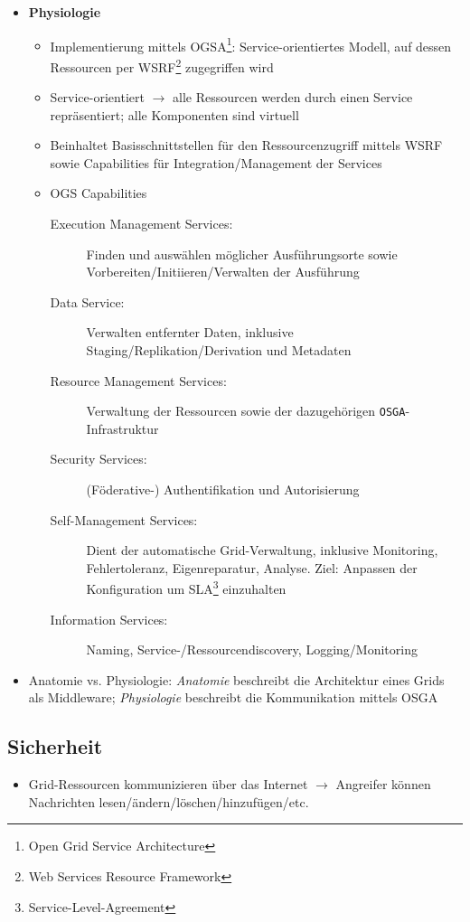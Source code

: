 \begin{itemize}
\begin{itemize}
	\end{itemize}
	\item \textbf{Physiologie}
	\begin{itemize}
		\item Implementierung mittels OGSA\footnote{Open Grid Service Architecture}: Service-orientiertes Modell, auf dessen Ressourcen per WSRF\footnote{Web Services Resource Framework} zugegriffen wird
		\item Service-orientiert \(\rightarrow\) alle Ressourcen werden durch einen Service repräsentiert; alle Komponenten sind virtuell
		\item Beinhaltet Basisschnittstellen für den Ressourcenzugriff mittels WSRF sowie Capabilities für Integration/Management der Services
		\item OGS Capabilities
		\begin{description}
			\item[Execution Management Services:] Finden und auswählen möglicher Ausführungsorte sowie Vorbereiten/Initiieren/Verwalten der Ausführung
			\item[Data Service:] Verwalten entfernter Daten, inklusive Staging/Replikation/Derivation und Metadaten
			\item[Resource Management Services:] Verwaltung der Ressourcen sowie der dazugehörigen \texttt{OSGA}-Infrastruktur
			\item[Security Services:] (Föderative-) Authentifikation und Autorisierung
			\item[Self-Management Services:] Dient der automatische Grid-Verwaltung, inklusive Monitoring, Fehlertoleranz, Eigenreparatur, Analyse. Ziel: Anpassen der Konfiguration um SLA\footnote{Service-Level-Agreement} einzuhalten
			\item[Information Services:] Naming, Service-/Ressourcendiscovery, Logging/Monitoring
		\end{description}
	\end{itemize}
	\item Anatomie vs. Physiologie: \textit{Anatomie} beschreibt die Architektur eines Grids als Middleware; \textit{Physiologie} beschreibt die Kommunikation mittels OSGA
\end{itemize}


\subsection{Sicherheit}
\begin{itemize}
	\item Grid-Ressourcen kommunizieren über das Internet \(\rightarrow\) Angreifer können Nachrichten lesen/ändern/löschen/hinzufügen/etc.
\end{itemize}


